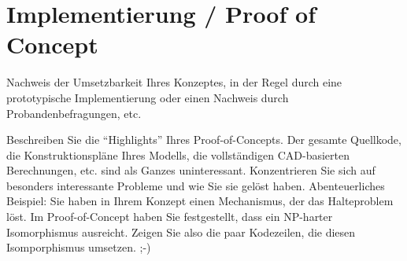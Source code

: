 \chapter{Implementierung / Proof of Concept}\label{chap:ProofOfConcept}
Nachweis der Umsetzbarkeit Ihres Konzeptes, in der Regel durch eine prototypische Implementierung oder einen Nachweis durch Probandenbefragungen, etc.

Beschreiben Sie die \enquote{Highlights} Ihres Proof-of-Concepts. Der gesamte Quellkode, die Konstruktionspläne Ihres Modells, die vollständigen CAD-basierten Berechnungen, etc. sind als Ganzes uninteressant. Konzentrieren Sie sich auf besonders interessante Probleme und wie Sie sie gelöst haben. Abenteuerliches Beispiel: Sie haben in Ihrem Konzept einen Mechanismus, der das Halteproblem löst. Im Proof-of-Concept haben Sie festgestellt, dass ein NP-harter Isomorphismus ausreicht. Zeigen Sie also die paar Kodezeilen, die diesen Isomporphismus umsetzen. ;-)


